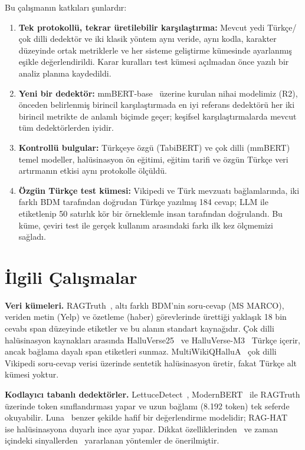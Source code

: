 \documentclass[conference,a4paper]{IEEEtran}
\begin{document}
Bu çalışmanın katkıları şunlardır:
\begin{enumerate}
\item \textbf{Tek protokollü, tekrar üretilebilir karşılaştırma:} Mevcut yedi Türkçe/çok dilli dedektör ve iki klasik yöntem aynı veride, aynı kodla, karakter düzeyinde ortak metriklerle ve her sisteme geliştirme kümesinde ayarlanmış eşikle değerlendirildi. Karar kuralları test kümesi açılmadan önce yazılı bir analiz planına kaydedildi.
\item \textbf{Yeni bir dedektör:} mmBERT-base~\cite{marone2025mmbert} üzerine kurulan nihai modelimiz (R2), önceden belirlenmiş birincil karşılaştırmada en iyi referans dedektörü her iki birincil metrikte de anlamlı biçimde geçer; keşifsel karşılaştırmalarda mevcut tüm dedektörlerden iyidir.
\item \textbf{Kontrollü bulgular:} Türkçeye özgü (TabiBERT) ve çok dilli (mmBERT) temel modeller, halüsinasyon ön eğitimi, eğitim tarifi ve özgün Türkçe veri artırmanın etkisi aynı protokolle ölçüldü.
\item \textbf{Özgün Türkçe test kümesi:} Vikipedi ve Türk mevzuatı bağlamlarında, iki farklı BDM tarafından doğrudan Türkçe yazılmış 184 cevap; LLM ile etiketlenip 50 satırlık kör bir örneklemle insan tarafından doğrulandı. Bu küme, çeviri test ile gerçek kullanım arasındaki farkı ilk kez ölçmemizi sağladı.
\end{enumerate}

\section{İlgili Çalışmalar}

\textbf{Veri kümeleri.} RAGTruth~\cite{niu2024ragtruth}, altı farklı BDM'nin soru-cevap (MS MARCO), veriden metin (Yelp) ve özetleme (haber) görevlerinde ürettiği yaklaşık 18 bin cevabı span düzeyinde etiketler ve bu alanın standart kaynağıdır. Çok dilli halüsinasyon kaynakları arasında HalluVerse25~\cite{abdaljalil2025halluverse25} ve HalluVerse-M3~\cite{abdaljalil2026halluversem3} Türkçe içerir, ancak bağlama dayalı span etiketleri sunmaz. MultiWikiQHalluA~\cite{thoresen2026multiwiki} çok dilli Vikipedi soru-cevap verisi üzerinde sentetik halüsinasyon üretir, fakat Türkçe alt kümesi yoktur.

\textbf{Kodlayıcı tabanlı dedektörler.} LettuceDetect~\cite{kovacs2025lettucedetect}, ModernBERT~\cite{warner2024modernbert} ile RAGTruth üzerinde token sınıflandırması yapar ve uzun bağlamı (8.192 token) tek seferde okuyabilir. Luna~\cite{belyi2025luna} benzer şekilde hafif bir değerlendirme modelidir; RAG-HAT~\cite{song2024raghat} ise halüsinasyona duyarlı ince ayar yapar. Dikkat özelliklerinden~\cite{ogasa2025multiview} ve zaman içindeki sinyallerden~\cite{itkin2026temporal} yararlanan yöntemler de önerilmiştir.
\end{document}
